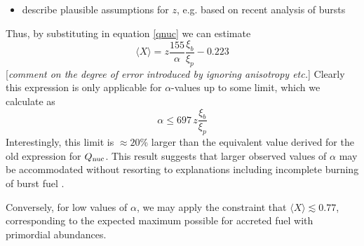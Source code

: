 \documentclass{aastex63}
\begin{document}
\begin{itemize}
\item describe plausible assumptions for $z$, e.g. based on recent analysis of bursts
\end{itemize}

Thus, by substituting in equation \ref{qnuc} we can estimate 
\begin{equation}
\langle X\rangle 
 = z\frac{155}{\alpha}\frac{\xi_b}{\xi_p} - 0.223 \label{xbar}
\end{equation}
[{\it comment on the degree of error introduced by ignoring anisotropy etc.}] 
%
Clearly this expression is only applicable for $\alpha$-values up to some limit, which we calculate as
\begin{equation}
\alpha \leq 697\, z \frac{\xi_b}{\xi_p}
\end{equation}
Interestingly, this limit is 
$\approx20$\%
%
larger than the equivalent value derived for the old expression for $Q_{\rm nuc}$. This result suggests that larger observed values of $\alpha$ may be accommodated without resorting to explanations including incomplete burning of burst fuel \cite[e.g.][]{bcatalog}.

Conversely, for low values of $\alpha$, we may apply the constraint that $\langle X\rangle \lesssim 0.77$, corresponding to the expected maximum possible for accreted fuel with primordial abundances.
\end{document}
